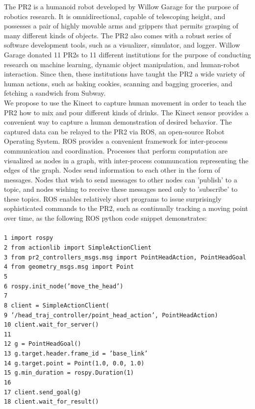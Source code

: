 \documentclass{sig-alternate}
\begin{document}
The PR2 is a humanoid robot developed by  Willow Garage\cite{pr2} for the purpose of robotics research. It is omnidirectional, capable of telescoping height, and possesses a pair of highly movable arms and grippers that permits grasping of many different kinds of objects. The PR2 also comes with a robust series of software development tools, such as a visualizer, simulator, and logger. Willow Garage donated 11 PR2s to 11 different institutions for the purpose of conducting research on machine learning, dynamic object manipulation, and human-robot interaction\cite{ros_pr2}. Since then, these institutions have taught the PR2 a wide variety of human actions, such as baking cookies\cite{cookies}, scanning and bagging groceries\cite{groceries}, and fetching a sandwich from Subway\cite{subway}.\\

We propose to use the Kinect to capture human movement in order to teach the PR2 how to mix and pour different kinds of drinks. The Kinect sensor provides a convenient way to capture a human demonstration of desired behavior. The captured data can be relayed to the PR2 via ROS, an open-source Robot Operating System\cite{ros}. ROS provides a convenient framework for inter-process communication and coordination. Processes that perform computation are visualized as nodes in a graph, with inter-process communcation representing the edges of the graph. Nodes send information to each other in the form of messages. Nodes that wish to send messages to other nodes can 'publish' to a topic, and nodes wishing to receive these messages need only to 'subscribe' to these topics. ROS enables relatively short programs to issue surprisingly sophisticated commands to the PR2, such as continually tracking a moving point over time, as the following ROS python code snippet demonstrates\cite{ros_pr2}:\\
{\tt \\1 import rospy\\
2 from actionlib import SimpleActionClient\\
3 from pr2\_controllers\_msgs.msg import PointHeadAction, PointHeadGoal\\
4 from geometry\_msgs.msg import Point\\
5\\
6 rospy.init\_node('move\_the\_head')\\
7\\
8 client = SimpleActionClient(\\
9 '/head\_traj\_controller/point\_head\_action', PointHeadAction)\\
10 client.wait\_for\_server()\\
11\\
12 g = PointHeadGoal()\\
13 g.target.header.frame\_id = 'base\_link'\\
14 g.target.point = Point(1.0, 0.0, 1.0)\\
15 g.min\_duration = rospy.Duration(1)\\
16\\
17 client.send\_goal(g)\\
18 client.wait\_for\_result()\\
}
\end{document}
